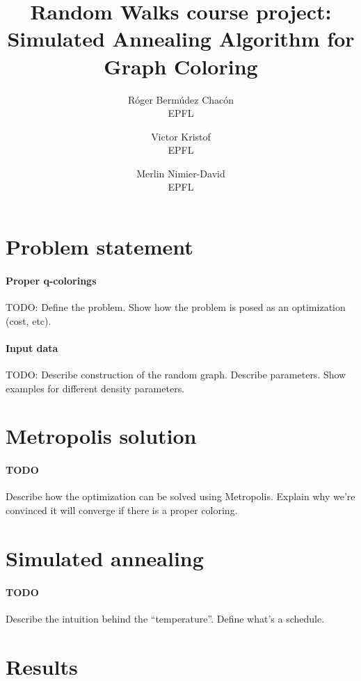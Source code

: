 \documentclass{report}
\title{Random Walks course project: Simulated Annealing Algorithm for Graph Coloring}
\author{
  R\'oger Berm\'udez Chac\'on\\EPFL
  \and
  Victor Kristof\\EPFL
  \and
  Merlin Nimier-David\\EPFL
}
\begin{document}
  \maketitle

  \section*{Problem statement}
  \paragraph{Proper q-colorings}
  TODO: Define the problem. Show how the problem is posed as an optimization (cost, etc).

  \paragraph{Input data}
  TODO: Describe construction of the random graph. Describe parameters. Show examples for different density parameters.

  \section*{Metropolis solution}
  \paragraph{TODO} Describe how the optimization can be solved using Metropolis. Explain why we're convinced it will converge if there is a proper coloring.

  \section*{Simulated annealing}
  \paragraph{TODO} Describe the intuition behind the ``temperature''. Define what's a schedule.

  \section*{Results}
\end{document}

